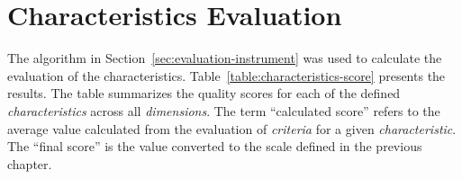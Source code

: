 \newpage
\section{Characteristics Evaluation}

The algorithm in Section~\ref{sec:evaluation-instrument} was used to calculate the evaluation of the characteristics.
Table~\ref{table:characteristics-score} presents the results.
The table summarizes the quality scores for each of the defined \textit{characteristics} across all \textit{dimensions}.
The term \enquote{calculated score} refers to the average value calculated from the evaluation of \textit{criteria} for a given \textit{characteristic}.
The \enquote{final score} is the value converted to the scale defined in the previous chapter.

\begin{table}[htbp]
    \centering
    \small


\end{table}
